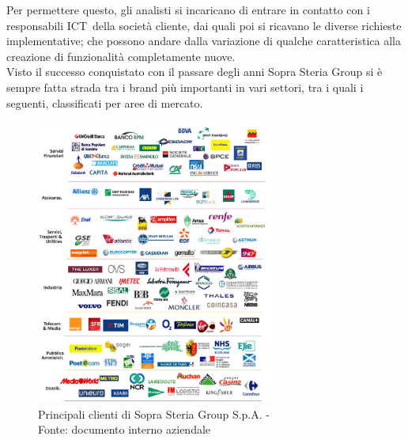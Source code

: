 	 Per permettere questo, gli analisti si incaricano di entrare in contatto con i responsabili ICT\glossario\ della società cliente, dai quali poi si ricavano le diverse richieste implementative;  che possono andare dalla variazione di qualche caratteristica alla creazione di funzionalità completamente nuove.\\

	
	Visto il successo conquistato con il passare degli anni Sopra Steria Group si è sempre fatta strada tra i brand più importanti in vari settori, tra i quali i seguenti, classificati per aree di mercato.
	\begin{figure}[H]
	\centering
   	\includegraphics[width=0.7\textwidth]{immagini/principali_referenze}
   	\caption{Principali clienti di Sopra Steria Group S.p.A. - \\Fonte: documento interno aziendale}
	\end{figure}

